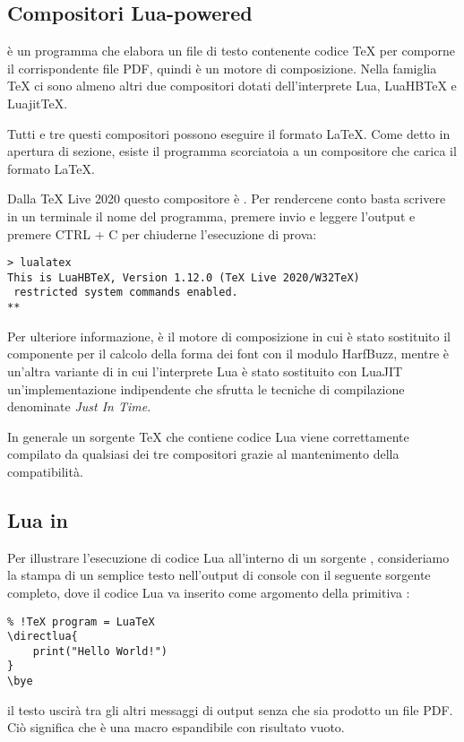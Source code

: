 \subsection{Compositori Lua-powered}

\LuaTeX{} è un programma che elabora un file di testo contenente codice \TeX{}
per comporne il corrispondente file PDF, quindi è un motore di composizione.
Nella famiglia \TeX{} ci sono almeno altri due compositori dotati
dell'interprete Lua, LuaHB\TeX{} e Luajit\TeX{}.

Tutti e tre questi compositori possono eseguire il formato \LaTeX. Come detto in
apertura di sezione, esiste il programma  scorciatoia a un
compositore che carica il formato \LaTeX.

Dalla TeX Live 2020 questo compositore è . Per rendercene conto
basta scrivere in un terminale il nome del programma, premere invio e leggere
l'output e premere CTRL + C per chiuderne l'esecuzione di prova:
\begin{Verbatim}
> lualatex
This is LuaHBTeX, Version 1.12.0 (TeX Live 2020/W32TeX)
 restricted system commands enabled.
**
\end{Verbatim}

Per ulteriore informazione,  è il motore di composizione
 in cui è stato sostituito il componente per il calcolo della forma
dei font con il modulo HarfBuzz, mentre  è un'altra variante di
 in cui l'interprete Lua è stato sostituito con LuaJIT
un'implementazione indipendente che sfrutta le tecniche di compilazione
denominate \emph{Just In Time}.

In generale un sorgente \TeX{} che contiene codice Lua viene correttamente
compilato da qualsiasi dei tre compositori grazie al mantenimento della
compatibilità.


\subsection{Lua in \LuaTeX}

Per illustrare l'esecuzione di codice Lua all'interno di un sorgente \LuaTeX,
consideriamo la stampa di un semplice testo nell'output di console con il
seguente sorgente completo, dove il codice Lua va inserito come argomento della
primitiva :
\begin{Verbatim}
% !TeX program = LuaTeX
\directlua{
    print("Hello World!")
}
\bye
\end{Verbatim}
il testo uscirà tra gli altri messaggi di output senza che sia prodotto un file
PDF. Ciò significa che  è una macro espandibile con risultato
vuoto.

